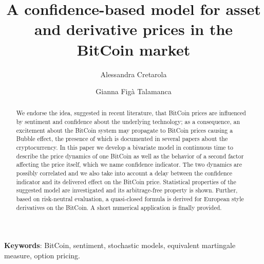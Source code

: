 \documentclass[12pt,centertags,reqno]{amsart}
\numberwithin{equation}{section} \makeatletter
\begin{document}
\date{}


\author[A.~Cretarola]{Alessandra Cretarola}
\address{Alessandra Cretarola, Department of Mathematics and Computer Science,
 University of Perugia, Via Luigi Vanvitelli, 1, I-06123 Perugia, Italy.}

\author[G.~Figà Talamanca]{Gianna Figà Talamanca}
\address{Gianna Figà Talamanca, Department of Economics,
University of Perugia, Via Alessandro Pascoli,
I-06123 Perugia, Italy.}





%
%
\title[A confidence-based model for asset and derivative prices in the BitCoin market
]{A confidence-based model for asset and derivative prices in the BitCoin market}


\begin{abstract}
We endorse the idea, suggested in recent literature, that BitCoin prices are influenced by sentiment and confidence about the underlying technology; as a consequence, an excitement about the BitCoin system may propagate to  BitCoin prices causing a Bubble effect, the presence of which is documented in several papers about the cryptocurrency. 
In this paper we develop a bivariate model in continuous time to describe the price dynamics of one BitCoin as well as the behavior of a second factor affecting the price itself, which we name confidence indicator.
The two dynamics are possibly correlated and we also take into account a delay between the confidence indicator and its delivered effect on the BitCoin price. 
Statistical properties of the suggested model are investigated and
its arbitrage-free property is shown.
Further, based on risk-neutral evaluation, a quasi-closed formula is derived for European style derivatives on the BitCoin. A short numerical application is finally provided.
\end{abstract}

\maketitle

{\bf Keywords}: BitCoin, sentiment, stochastic models, equivalent martingale measure, option pricing.
\end{document}
